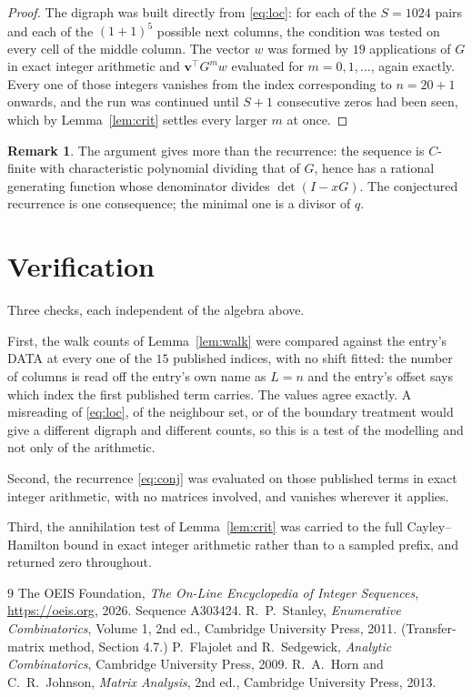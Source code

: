 \documentclass[11pt,a4paper]{article}
\theoremstyle{plain}
\theoremstyle{definition}
\newtheorem{remark}[theorem]{Remark}
\begin{document}
\begin{proof}
The digraph was built directly from \eqref{eq:loc}: for each of the $S=1024$ pairs and each
of the $(1+1)^{5}$ possible next columns, the condition was tested on every cell of
the middle column. The vector $w$ was formed by $19$ applications of $G$ in exact integer
arithmetic and $\mathbf{v}^{\!\top}G^{m}w$ evaluated for $m=0,1,\dots$, again exactly.
Every one of those integers vanishes from the index corresponding to $n=20+1$ onwards,
and the run was continued until $S+1$ consecutive zeros had been seen, which by
Lemma~\ref{lem:crit} settles every larger $m$ at once.
\end{proof}

\begin{remark}
The argument gives more than the recurrence: the sequence is $C$-finite with characteristic
polynomial dividing that of $G$, hence has a rational generating function whose denominator
divides $\det(I-xG)$. The conjectured recurrence is one consequence; the minimal one is a
divisor of $q$.
\end{remark}

\section{Verification}

Three checks, each independent of the algebra above.

First, the walk counts of Lemma~\ref{lem:walk} were compared against the entry's DATA at
every one of the $15$ published indices, with no shift fitted: the number of columns is
read off the entry's own name as $L=n$ and the entry's offset says which index the first
published term carries. The values agree exactly. A misreading of \eqref{eq:loc}, of the
neighbour set, or of the boundary treatment would give a different digraph and different
counts, so this is a test of the modelling and not only of the arithmetic.

Second, the recurrence \eqref{eq:conj} was evaluated on those published terms in exact
integer arithmetic, with no matrices involved, and vanishes wherever it applies.

Third, the annihilation test of Lemma~\ref{lem:crit} was carried to the full
Cayley--Hamilton bound in exact integer arithmetic rather than to a sampled prefix, and
returned zero throughout.

\begin{thebibliography}{9}
 The OEIS Foundation, \emph{The On-Line Encyclopedia of Integer
Sequences}, \url{https://oeis.org}, 2026. Sequence A303424.
 R.~P.~Stanley, \emph{Enumerative Combinatorics}, Volume 1, 2nd ed.,
Cambridge University Press, 2011. (Transfer-matrix method, Section 4.7.)
 P.~Flajolet and R.~Sedgewick, \emph{Analytic Combinatorics}, Cambridge
University Press, 2009.
 R.~A.~Horn and C.~R.~Johnson, \emph{Matrix Analysis}, 2nd ed., Cambridge
University Press, 2013.
\end{thebibliography}
\end{document}
